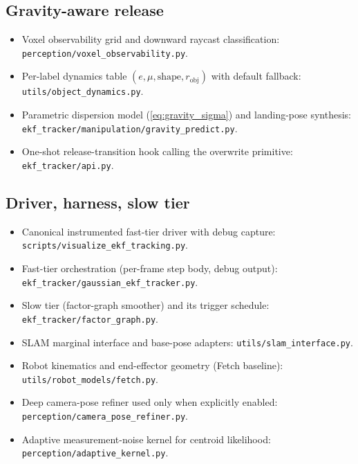 \documentclass[11pt]{article}
\newcommand{\file}[1]{\texttt{#1}}
\begin{document}
\subsection*{Gravity-aware release}
\begin{itemize}[leftmargin=1.5em,itemsep=0pt,topsep=2pt]
\item Voxel observability grid and downward raycast classification: \file{perception/voxel\_observability.py}.
\item Per-label dynamics table $(e,\mu,\text{shape},r_{\text{obj}})$ with default fallback: \file{utils/object\_dynamics.py}.
\item Parametric dispersion model (\eqref{eq:gravity_sigma}) and landing-pose synthesis: \file{ekf\_tracker/manipulation/gravity\_predict.py}.
\item One-shot release-transition hook calling the overwrite primitive: \file{ekf\_tracker/api.py}.
\end{itemize}

\subsection*{Driver, harness, slow tier}
\begin{itemize}[leftmargin=1.5em,itemsep=0pt,topsep=2pt]
\item Canonical instrumented fast-tier driver with debug capture: \file{scripts/visualize\_ekf\_tracking.py}.
\item Fast-tier orchestration (per-frame step body, debug output): \file{ekf\_tracker/gaussian\_ekf\_tracker.py}.
\item Slow tier (factor-graph smoother) and its trigger schedule: \file{ekf\_tracker/factor\_graph.py}.
\item SLAM marginal interface and base-pose adapters: \file{utils/slam\_interface.py}.
\item Robot kinematics and end-effector geometry (Fetch baseline): \file{utils/robot\_models/fetch.py}.
\item Deep camera-pose refiner used only when explicitly enabled: \file{perception/camera\_pose\_refiner.py}.
\item Adaptive measurement-noise kernel for centroid likelihood: \file{perception/adaptive\_kernel.py}.
\end{itemize}
\end{document}
